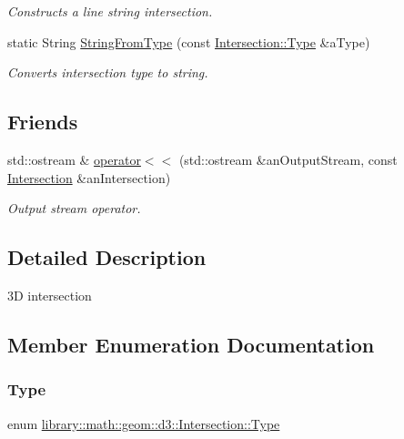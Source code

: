 \begin{DoxyCompactItemize}
\begin{DoxyCompactList}\small\item\em Constructs a line string intersection. \end{DoxyCompactList}\item 
static String \hyperlink{classlibrary_1_1math_1_1geom_1_1d3_1_1_intersection_a7294c6aa40d2353f1f4d7d6019c9dbdc}{String\+From\+Type} (const \hyperlink{classlibrary_1_1math_1_1geom_1_1d3_1_1_intersection_a3465d607fd42380f350598e055271b05}{Intersection\+::\+Type} \&a\+Type)
\begin{DoxyCompactList}\small\item\em Converts intersection type to string. \end{DoxyCompactList}\end{DoxyCompactItemize}
\subsection*{Friends}
\begin{DoxyCompactItemize}
\item 
std\+::ostream \& \hyperlink{classlibrary_1_1math_1_1geom_1_1d3_1_1_intersection_a8ff783039001be6a871338148f4f2919}{operator$<$$<$} (std\+::ostream \&an\+Output\+Stream, const \hyperlink{classlibrary_1_1math_1_1geom_1_1d3_1_1_intersection}{Intersection} \&an\+Intersection)
\begin{DoxyCompactList}\small\item\em Output stream operator. \end{DoxyCompactList}\end{DoxyCompactItemize}


\subsection{Detailed Description}
3D intersection 

\subsection{Member Enumeration Documentation}
\mbox{\label{classlibrary_1_1math_1_1geom_1_1d3_1_1_intersection_a3465d607fd42380f350598e055271b05}} 
\subsubsection{\texorpdfstring{Type}{Type}}
{\footnotesize\ttfamily enum \hyperlink{classlibrary_1_1math_1_1geom_1_1d3_1_1_intersection_a3465d607fd42380f350598e055271b05}{library\+::math\+::geom\+::d3\+::\+Intersection\+::\+Type}\hspace{0.3cm}{\ttfamily [strong]}}

